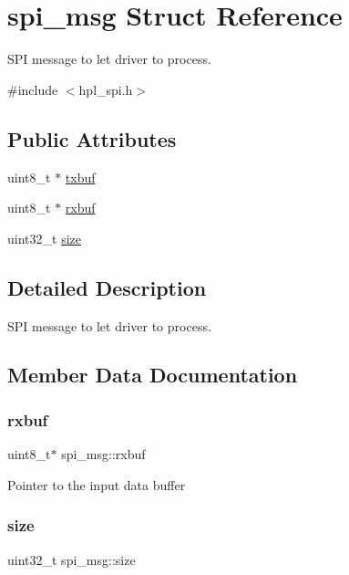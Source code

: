 \hypertarget{structspi__msg}{}\section{spi\+\_\+msg Struct Reference}
\label{structspi__msg}


S\+PI message to let driver to process.  




{\ttfamily \#include $<$hpl\+\_\+spi.\+h$>$}

\subsection*{Public Attributes}
\begin{DoxyCompactItemize}
\item 
uint8\+\_\+t $\ast$ \hyperlink{structspi__msg_a250cdea72eff03e07bdecad08a62520d}{txbuf}
\item 
uint8\+\_\+t $\ast$ \hyperlink{structspi__msg_a74c30d77a401beeb956f1c77d87df086}{rxbuf}
\item 
uint32\+\_\+t \hyperlink{structspi__msg_a4a1fed078524dbc116d48244e663a489}{size}
\end{DoxyCompactItemize}


\subsection{Detailed Description}
S\+PI message to let driver to process. 

\subsection{Member Data Documentation}
\mbox{\label{structspi__msg_a74c30d77a401beeb956f1c77d87df086}} 
\subsubsection{\texorpdfstring{rxbuf}{rxbuf}}
{\footnotesize\ttfamily uint8\+\_\+t$\ast$ spi\+\_\+msg\+::rxbuf}

Pointer to the input data buffer \mbox{\label{structspi__msg_a4a1fed078524dbc116d48244e663a489}} 
\subsubsection{\texorpdfstring{size}{size}}
{\footnotesize\ttfamily uint32\+\_\+t spi\+\_\+msg\+::size}

